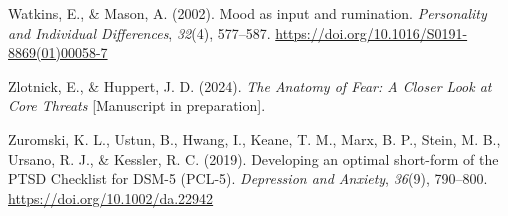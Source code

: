 \documentclass[
  man,floatsintext]{apa7}
\newlength{\cslhangindent}
\newlength{\cslentryspacingunit} %
\newenvironment{CSLReferences}[2] %
 {%
  \setlength{\parindent}{0pt}
  \ifodd #1
  \let\oldpar\par
  \def\par{\hangindent=\cslhangindent\oldpar}
  \fi
  \setlength{\parskip}{#2\cslentryspacingunit}
 }%
 {}
\begin{document}
\begin{CSLReferences}{1}{0}
\leavevmode{}%
Watkins, E., \& Mason, A. (2002). Mood as input and rumination. \emph{Personality and Individual Differences}, \emph{32}(4), 577--587. \url{https://doi.org/10.1016/S0191-8869(01)00058-7}

\leavevmode{}%
Zlotnick, E., \& Huppert, J. D. (2024). \emph{The Anatomy of Fear: A Closer Look at Core Threats} {[}Manuscript in preparation{]}.

\leavevmode{}%
Zuromski, K. L., Ustun, B., Hwang, I., Keane, T. M., Marx, B. P., Stein, M. B., Ursano, R. J., \& Kessler, R. C. (2019). Developing an optimal short-form of the PTSD Checklist for DSM-5 (PCL-5). \emph{Depression and Anxiety}, \emph{36}(9), 790--800. \url{https://doi.org/10.1002/da.22942}

\end{CSLReferences}
\end{document}
